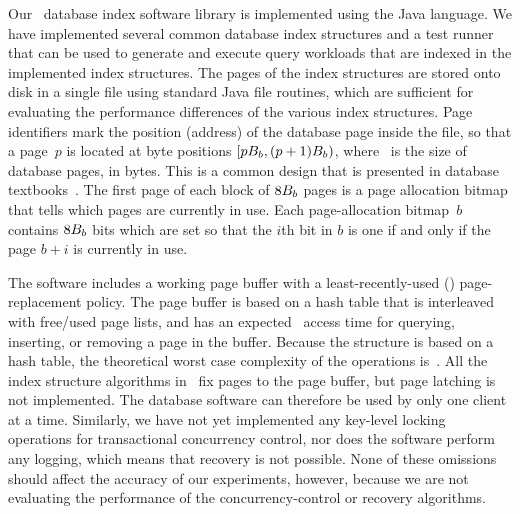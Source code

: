 Our \TreeLib\ database index software library is implemented
using the Java language.
We have implemented several common database index structures and a test
runner that can be used to generate and execute query workloads that are
indexed in the implemented index structures. 
The pages of the index structures are stored onto disk in a single
file using standard Java file  routines, which are sufficient for
evaluating the performance differences of the various index structures.
Page identifiers mark the position (address) of the database page inside the
file, so that a page~$p$ is located at byte positions $[p B_b, (p+1)
B_b)$, where \pagesize\ is the size of database pages, in bytes. 
This is a common design that is presented in database
textbooks~\cite{gray:1993:transactionprocessing}.
The first page of each block of $8 B_b$ pages is a page allocation
bitmap that tells which pages are currently in use.
Each page-allocation bitmap~$b$ contains $8 B_b$ bits which are set so 
that the $i$th bit in $b$ is one if and only if the page $b + i$ is
currently in use.

The software includes a working page buffer with a
least-recently-used (\label{def:lru})
page-replacement policy. 
The page buffer is based on a hash table that is interleaved with free/used
page lists, and has an expected~ access time for querying, inserting,
or removing a page in the buffer.
Because the structure is based on a hash table, the theoretical worst case
complexity of the operations is~. 
All the index structure algorithms in \TreeLib\ fix pages to the page
buffer, but page latching is not implemented. 
The database software can therefore be used by only one client at a time.
Similarly, we have not yet implemented any key-level locking
operations for transactional concurrency control, nor does the software
perform any logging, which means that recovery is not possible.
None of these omissions should affect the accuracy of our experiments,
however, because we are not evaluating the performance of the
concurrency-control or recovery algorithms.

